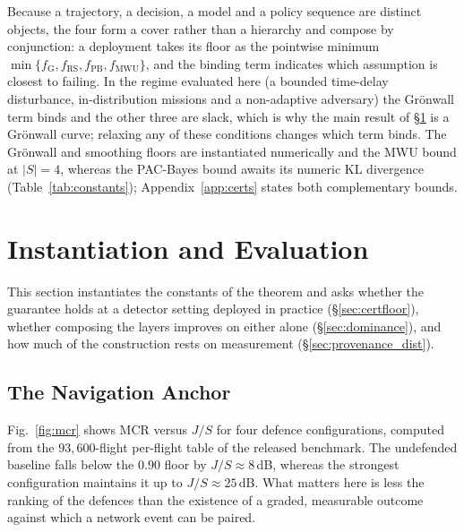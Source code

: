 Because a trajectory, a decision, a model and a policy sequence are distinct
objects, the four form a cover rather than a hierarchy and compose by
conjunction: a deployment takes its floor as the pointwise minimum
$\min\{f_{\mathrm{G}},f_{\mathrm{RS}},f_{\mathrm{PB}},f_{\mathrm{MWU}}\}$, and
the binding term indicates which assumption is closest to failing. In the
regime evaluated here (a bounded time-delay disturbance, in-distribution
missions and a non-adaptive adversary) the Gr\"onwall term binds and the other
three are slack, which is why the main result of \S\ref{sec:eval} is a
Gr\"onwall curve; relaxing any of these conditions changes which term binds.
The Gr\"onwall and smoothing floors are instantiated numerically and the MWU
bound at $|S|=4$, whereas the PAC-Bayes bound awaits its numeric KL divergence
(Table~\ref{tab:constants}); Appendix~\ref{app:certs} states both
complementary bounds.

\section{Instantiation and Evaluation}
\label{sec:eval}
This section instantiates the constants of the theorem and asks whether the
guarantee holds at a detector setting deployed in practice
(\S\ref{sec:certfloor}), whether composing the layers improves on either alone
(\S\ref{sec:dominance}), and how much of the construction rests on measurement
(\S\ref{sec:provenance_dist}).

\subsection{The Navigation Anchor}
Fig.~\ref{fig:mcr} shows MCR versus $J/S$ for four defence configurations,
computed from the $93{,}600$-flight per-flight table of the released benchmark.
The undefended baseline falls below the $0.90$ floor by $J/S\!\approx\!8$\,dB,
whereas the strongest configuration maintains it up to $J/S\!\approx\!25$\,dB.
What matters here is less the ranking of the defences than the existence of a
graded, measurable outcome against which a network event can be paired.

